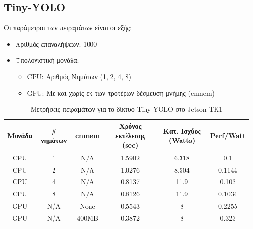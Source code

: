 
\subsection{Tiny-YOLO}

Οι παράμετροι των πειραμάτων είναι οι εξής:
\begin{itemize}
  \item{Αριθμός επαναλήψεων: 1000}
  \item{Υπολογιστική μονάδα:}
    \begin{itemize}
      \item{CPU: Αριθμός Νημάτων (1, 2, 4, 8)}
      \item{GPU: Με και χωρίς εκ των προτέρων δέσμευση μνήμης (cnmem)}
    \end{itemize}
\end{itemize}

\begin{table}[H]
  \begin{center}
    \caption{Μετρήσεις πειραμάτων για το δίκτυο Tiny-YOLO στο Jetson TK1}
    \label{tab:yolo_jetson}
    \small
    \begin{tabular}[center]{ | c | c | c | c | c | c | }
      \hline
      \rowcolor{Gray}
      Μονάδα & \# νημάτων & cnmem & Χρόνος εκτέλεσης (sec) & Κατ. Ισχύος (Watts) & Perf/Watt \\
      \hline
      CPU & 1 & N/A & 1.5902 & 6.318 & 0.1\\
      CPU & 2 & N/A & 1.0276 & 8.504 & 0.1144\\
      CPU & 4 & N/A & 0.8137 & 11.9 & 0.103\\
      CPU & 8 & N/A & 0.8126 & 11.9 & 0.1034\\
      GPU & N/A & None & 0.5543 & 8 & 0.2255\\
      GPU & N/A & 400MB & 0.3872 & 8 & 0.323\\
      \hline
    \end{tabular}
  \end{center}
\end{table}

